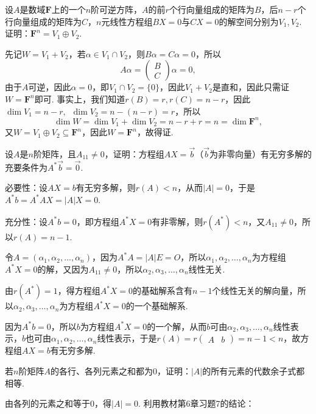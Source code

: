 \begin{exercise}
\begin{exgroup}
        \item 设$A$是数域$\mathbf{F}$上的一个$n$阶可逆方阵，$A$的前$r$个行向量组成的矩阵为$B$，后$n-r$个行向量组成的矩阵为$C$，$n$元线性方程组$BX=0$与$CX=0$的解空间分别为$V_1,V_2$. 证明：$\mathbf{F}^n=V_1\oplus V_2$.
        \begin{answer}
            先记$W=V_1+V_2$，若$\alpha\in V_1\cap V_2$，则$B\alpha=C\alpha=0$，所以
            \[A\alpha=\begin{pmatrix}
                    B \\
                    C
                \end{pmatrix}\alpha=0,\]
            由于$A$可逆，因此$\alpha=0$，即$V_1\cap V_2=\{0\}$，因此$V_1+V_2$是直和，因此只需证$W=\mathbf{F}^n$即可. 事实上，我们知道$r(B)=r,r(C)=n-r$，因此$\dim V_1=n-r,\enspace \dim V_2=n-(n-r)=r$，所以
            \[\dim W=\dim V_1+\dim V_2=n-r+r=n=\dim \mathbf{F}^n,\]
            又$W=V_1\oplus V_2\subseteq \mathbf{F}^n$，因此$W=\mathbf{F}^n$，故得证.
        \end{answer}

        \item 设$A$是$n$阶矩阵，且$A_{11}\neq 0$，证明：方程组$AX=\vec{b}$（$\vec{b}$为非零向量）有无穷多解的充要条件为$A^*\vec{b}=\vec{0}$.
        \begin{answer}
            必要性：设$AX=b$有无穷多解，则$r(A)<n$，从而$|A|=0$，于是$A^*b=A^*AX=|A|X=0$.

          充分性：设$A^*b=0$，即方程组$A^*X=0$有非零解，则$r(A^*)<n$，又$A_{11}\neq 0$，所以$r(A)=n-1$.

          令$A=(\alpha_1,\alpha_2,\ldots,\alpha_n)$，因为$A^*A=|A|E=O$，所以$\alpha_1,\alpha_2,\ldots,\alpha_n$为方程组$A^*X=0$的解，又因为$A_{11}\neq 0$，所以$\alpha_2,\alpha_3,\ldots,\alpha_n$线性无关.

          由$r(A^*)=1$，得方程组$A^*X=0$的基础解系含有$n-1$个线性无关的解向量，所以$\alpha_2,\alpha_3,\ldots,\alpha_n$为方程组$A^*X=0$的一个基础解系.

          因为$A^*b=0$，所以$b$为方程组$A^*X=0$的一个解，从而$b$可由$\alpha_2,\alpha_3,\ldots,\alpha_n$线性表示，$b$也可由$\alpha_1,\alpha_2,\ldots,\alpha_n$线性表示，于是$r(A) = r\begin{pmatrix}A & b\end{pmatrix}=n-1<n$，故方程组$AX=b$有无穷多解.
        \end{answer}

        \item 若$n$阶矩阵$A$的各行、各列元素之和都为0，证明：$|A|$的所有元素的代数余子式都相等.
        \begin{answer}
            由各列的元素之和等于0，得$|A|=0$. 利用教材第6章习题7的结论：


\end{answer}
\end{exgroup}
\end{exercise}
